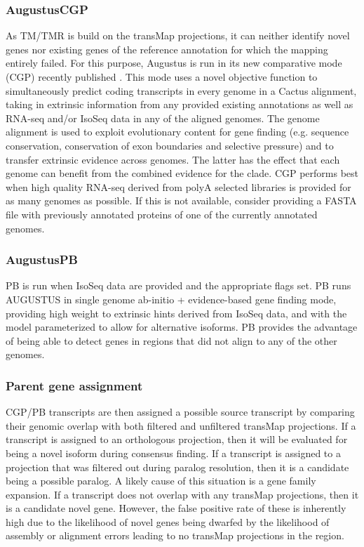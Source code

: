 \documentclass[fleqn,10pt]{wlscirep}
\begin{document}
\subsubsection{AugustusCGP}
	As TM/TMR is build on the transMap projections, it can neither identify novel genes nor existing genes of the reference annotation for which the mapping entirely failed. For this purpose, Augustus is run in its new comparative mode (CGP) recently published \cite{konig2015simultaneous}. This mode uses a novel objective function to simultaneously predict coding transcripts in every genome in a Cactus alignment, taking in extrinsic information from any provided existing annotations as well as RNA-seq and/or IsoSeq data in any of the aligned genomes. The genome alignment is used to exploit evolutionary content for gene finding (e.g. sequence conservation, conservation of exon boundaries and selective pressure) and to transfer extrinsic evidence across genomes. The latter has the effect that each genome can benefit from the combined evidence for the clade. CGP performs best when high quality RNA-seq derived from polyA selected libraries is provided for as many genomes as possible. If this is not available, consider providing a FASTA file with previously annotated proteins of one of the currently annotated genomes. 
    
\subsubsection{AugustusPB}
	PB is run when IsoSeq data are provided and the appropriate flags set. PB runs AUGUSTUS in single genome ab-initio + evidence-based gene finding mode, providing high weight to extrinsic hints derived from IsoSeq data, and with the model parameterized to allow for alternative isoforms. PB provides the advantage of being able to detect genes in regions that did not align to any of the other genomes.
    
\subsubsection{Parent gene assignment}
CGP/PB transcripts are then assigned a possible source transcript by comparing their genomic overlap with both filtered and unfiltered transMap projections. If a transcript is assigned to an orthologous projection, then it will be evaluated for being a novel isoform during consensus finding. If a transcript is assigned to a projection that was filtered out during paralog resolution, then it is a candidate being a possible paralog. A likely cause of this situation is a gene family expansion. If a transcript does not overlap with any transMap projections, then it is a candidate novel gene. However, the false positive rate of these is inherently high due to the likelihood of novel genes being dwarfed by the likelihood of assembly or alignment errors leading to no transMap projections in the region.
\end{document}
